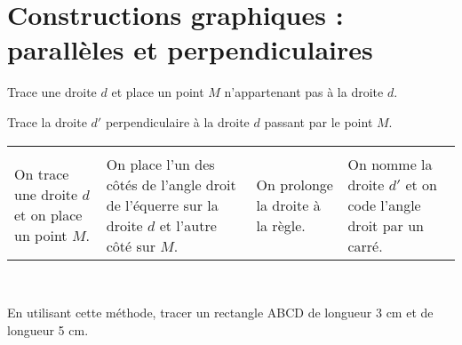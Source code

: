\section{Constructions graphiques : parallèles et perpendiculaires}

\begin{methode*1}

\begin{exemple*1}
Trace une droite $d$ et place un point $M$ n'appartenant pas à la droite $d$.

Trace la droite $d'$ perpendiculaire à la droite $d$ passant par le point $M$. \\[0.75em]

\begin{tabularx}{\textwidth}{X|X|X|X}
 &   &   &   \\ 
 On trace une droite $d$ et on place un point $M$. & On place l'un des côtés de l'angle droit de l'équerre sur la droite $d$ et l'autre côté sur $M$.
 & On prolonge la droite à la règle. & On nomme la droite $d'$ et on code l'angle droit par un carré.\\

\end{tabularx} \\
 
 \end{exemple*1}


\exercice

En utilisant cette méthode, tracer un rectangle ABCD de longueur 3 cm et de longueur 5 cm.


 
\end{methode*1}

\newpage


